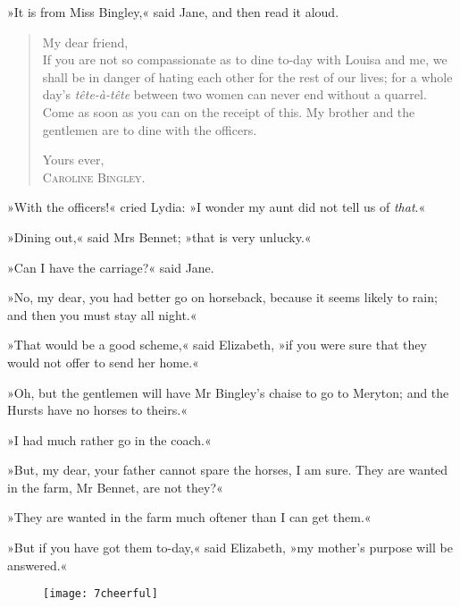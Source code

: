 »It is from Miss Bingley,« said Jane, and then read it aloud.


\begin{samepage}
\begin{quotation}
\noindent My dear friend,\\

\indent If you are not so compassionate as to dine to-day with Louisa and me, we shall be in danger of hating each other for the rest of our lives; for a whole day's \textit{tête-à-tête} between two women can never end without a quarrel. Come as soon as you can on the receipt of this. My brother and the gentlemen are to dine with the officers. \\

\begin{flushright}
Yours ever,\\
\textsc{Caroline Bingley.}
\end{flushright}
\end{quotation}
\end{samepage}

»With the officers!« cried Lydia: »I wonder my aunt did not tell us of \textit{that}.«

»Dining out,« said Mrs Bennet; »that is very unlucky.«

»Can I have the carriage?« said Jane.

»No, my dear, you had better go on horseback, because it seems likely to rain; and then you must stay all night.«

»That would be a good scheme,« said Elizabeth, »if you were sure that they would not offer to send her home.«

»Oh, but the gentlemen will have Mr Bingley's chaise to go to Meryton; and the Hursts have no horses to theirs.«

»I had much rather go in the coach.«

»But, my dear, your father cannot spare the horses, I am sure. They are wanted in the farm, Mr Bennet, are not they?«


»They are wanted in the farm much oftener than I can get them.«

»But if you have got them to-day,« said Elizabeth, »my mother's purpose will be answered.«

\begin{a4}
	\begin{figure}[tbh]
	\centering
	\texttt{[image: 7cheerful]}
	\end{figure}
\end{a4}

